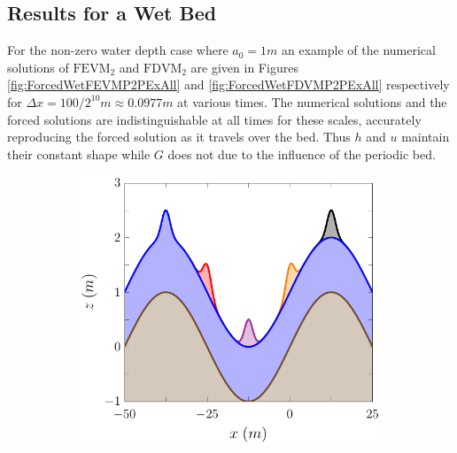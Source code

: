 \subsection{Results for a Wet Bed} 
For the non-zero water depth case where $a_0 = 1m$ an example of the numerical solutions of $\text{FEVM}_2$ and $\text{FDVM}_2$ are given in Figures \ref{fig:ForcedWetFEVMP2PExAll} and \ref{fig:ForcedWetFDVMP2PExAll} respectively for $\Delta x = 100/ 2^{10} m \approx 0.0977m $ at various times. The numerical solutions and the forced solutions are indistinguishable at all times for these scales, accurately reproducing the forced solution as it travels over the bed. Thus $h$ and $u$ maintain their constant shape while $G$ does not due to the influence of the periodic bed.
\begin{figure}
	\centering
	\begin{subfigure}{0.5\textwidth}
		\includegraphics[width=\textwidth]{./chp5/figures/Forced/Wet/FEVMw.pdf}
		\vspace{0.5cm}
	\end{subfigure}%
	\begin{subfigure}{0.5\textwidth}

\end{subfigure}
\end{figure}
